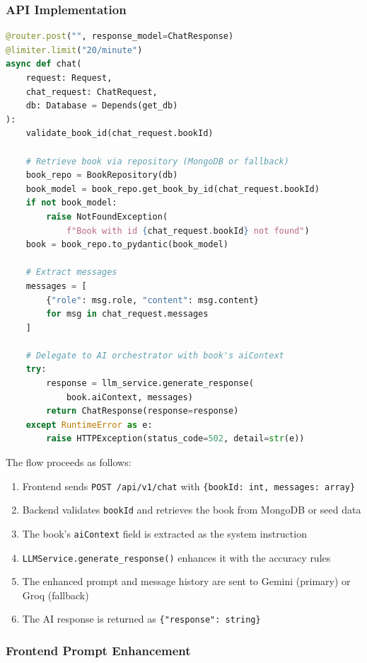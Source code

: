 \documentclass[11pt,a4paper]{article}
\begin{document}
\subsubsection{API Implementation}

\begin{lstlisting}[language=Python, caption=Per-book chat endpoint (actual implementation)]
@router.post("", response_model=ChatResponse)
@limiter.limit("20/minute")
async def chat(
    request: Request,
    chat_request: ChatRequest,
    db: Database = Depends(get_db)
):
    validate_book_id(chat_request.bookId)

    # Retrieve book via repository (MongoDB or fallback)
    book_repo = BookRepository(db)
    book_model = book_repo.get_book_by_id(chat_request.bookId)
    if not book_model:
        raise NotFoundException(
            f"Book with id {chat_request.bookId} not found")
    book = book_repo.to_pydantic(book_model)

    # Extract messages
    messages = [
        {"role": msg.role, "content": msg.content}
        for msg in chat_request.messages
    ]

    # Delegate to AI orchestrator with book's aiContext
    try:
        response = llm_service.generate_response(
            book.aiContext, messages)
        return ChatResponse(response=response)
    except RuntimeError as e:
        raise HTTPException(status_code=502, detail=str(e))
\end{lstlisting}

The flow proceeds as follows:

\begin{enumerate}
    \item Frontend sends \texttt{POST /api/v1/chat} with \texttt{\{bookId: int, messages: array\}}
    \item Backend validates \texttt{bookId} and retrieves the book from MongoDB or seed data
    \item The book's \texttt{aiContext} field is extracted as the system instruction
    \item \texttt{LLMService.generate\_response()} enhances it with the accuracy rules
    \item The enhanced prompt and message history are sent to Gemini (primary) or Groq (fallback)
    \item The AI response is returned as \texttt{\{"response": string\}}
\end{enumerate}

\subsubsection{Frontend Prompt Enhancement}
\end{document}
